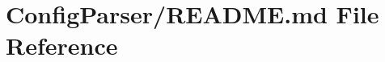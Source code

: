 \hypertarget{_config_parser_2_r_e_a_d_m_e_8md}{}\section{Config\+Parser/\+R\+E\+A\+D\+ME.md File Reference}
\label{_config_parser_2_r_e_a_d_m_e_8md}
